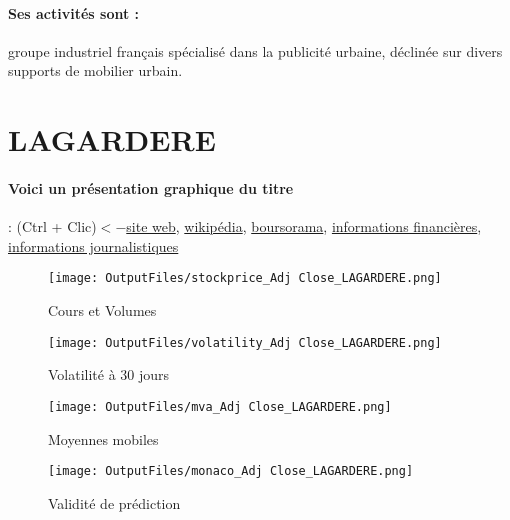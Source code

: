 \documentclass[11pt,a4paper]{report}%
\begin{document}
\paragraph{Ses activités sont : } groupe industriel français spécialisé dans la publicité urbaine, déclinée sur divers supports de mobilier urbain.  
    
    \newpage

\section{LAGARDERE}

\paragraph{Voici un présentation graphique du titre} : (Ctrl + Clic)$<-$\href{https://www.lagardere.com/relations-investisseurs-140.html}{site web}, \href{https://fr.wikipedia.org/wiki/Lagard%C3%A8re_(entreprise)}{wikipédia}, \href{https://www.boursorama.com/cours/1rPMMB}{boursorama}, \href{https://www.qwant.com/?q=site:https:%2f%2fwww.easybourse.com%2faction-societe%2fLAGARDERE&t=web&client=ext-firefox-hp}{informations financières}, \href{https://bourse.lerevenu.com/cours-de-bourse/fiche-valeur-synthese/LAGARDERE/MMB-FR}{informations journalistiques}
\begin{figure}[!htb]
   \begin{minipage}{0.5\textwidth}
     \centering
     \texttt{[image: OutputFiles/stockprice\_Adj Close\_LAGARDERE.png]}
     \caption{Cours et Volumes}\label{Fig:price_LAGARDERE}
   \end{minipage}\hfill
   \begin{minipage}{0.5\textwidth}
     \centering
     \texttt{[image: OutputFiles/volatility\_Adj Close\_LAGARDERE.png]}
     \caption{Volatilité à 30 jours}\label{Fig:volat_LAGARDERE}
   \end{minipage}
\end{figure}
\begin{figure}[!htb]
   \begin{minipage}{0.5\textwidth}
     \centering
     \texttt{[image: OutputFiles/mva\_Adj Close\_LAGARDERE.png]}
     \caption{Moyennes mobiles}\label{Fig:mva_LAGARDERE}
   \end{minipage}\hfill
   \begin{minipage}{0.5\textwidth}
     \centering
     \texttt{[image: OutputFiles/monaco\_Adj Close\_LAGARDERE.png]}
     \caption{Validité de prédiction}\label{Fig:prediction_LAGARDERE}
   \end{minipage}
\end{figure}
\end{document}
